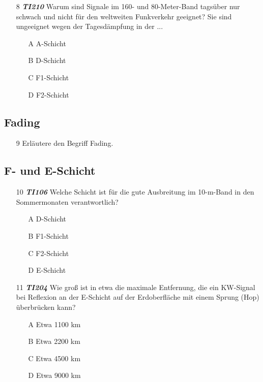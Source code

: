 \begin{enumerate} 
\itemsep1pt\parskip0pt
\item[8] \emph{\textbf{TI210}}   Warum sind Signale im 160- und 80-Meter-Band tagsüber nur schwach und nicht für den weltweiten Funkverkehr geeignet? Sie sind ungeeignet wegen der Tagesdämpfung in der ...
	\begin{enumerate}
	\itemsep1pt\parskip0pt
		\item[A] A-Schicht
		\item[B] D-Schicht
		\item[C] F1-Schicht
		\item[D] F2-Schicht
	\end{enumerate}
\end{enumerate}


\subsection*{Fading}

\begin{enumerate} 
\itemsep1pt\parskip0pt
\item[9] Erläutere den Begriff Fading.
\end{enumerate}

\subsection*{F- und E-Schicht}

\begin{enumerate} 
\itemsep1pt\parskip0pt
\item[10] \emph{\textbf{TI106}}   Welche Schicht ist für die gute Ausbreitung im 10-m-Band in den Sommermonaten verantwortlich?
	\begin{enumerate}
	\itemsep1pt\parskip0pt
		\item[A] D-Schicht
		\item[B] F1-Schicht
		\item[C] F2-Schicht
		\item[D] E-Schicht
	\end{enumerate}
\end{enumerate}

\begin{enumerate} 
\itemsep1pt\parskip0pt
\item[11] \emph{\textbf{TI204}}   Wie groß ist in etwa die maximale Entfernung, die ein KW-Signal bei Reflexion an der E-Schicht auf der Erdoberfläche mit einem Sprung (Hop) überbrücken kann?
	\begin{enumerate}
	\itemsep1pt\parskip0pt
		\item[A] Etwa 1100 km
		\item[B] Etwa 2200 km
		\item[C] Etwa 4500 km
		\item[D] Etwa 9000 km
	\end{enumerate}
\end{enumerate}

